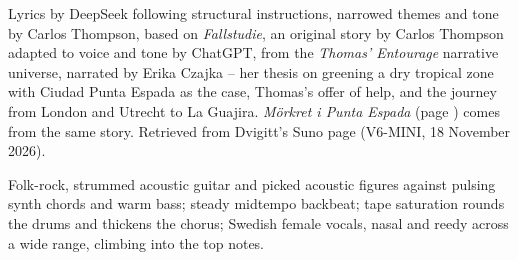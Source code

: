 
\label{sec:fran-stockholm-till-punta-espada}
\begin{notes}
Lyrics by DeepSeek following structural instructions, narrowed themes and tone by Carlos Thompson, based on \emph{Fallstudie}, an original story by Carlos Thompson adapted to voice and tone by ChatGPT, from the \emph{Thomas' Entourage} narrative universe, narrated by Erika Czajka -- her thesis on greening a dry tropical zone with Ciudad Punta Espada as the case, Thomas's offer of help, and the journey from London and Utrecht to La Guajira. \emph{Mörkret i Punta Espada} (page \pageref{sec:morkret-i-punta-espada}) comes from the same story. Retrieved from Dvigitt's Suno page (V6-MINI, 18 November 2026).
\end{notes}
\begin{style}
Folk-rock, strummed acoustic guitar and picked acoustic figures against pulsing synth chords and warm bass; steady midtempo backbeat; tape saturation rounds the drums and thickens the chorus; Swedish female vocals, nasal and reedy across a wide range, climbing into the top notes.
\end{style}
